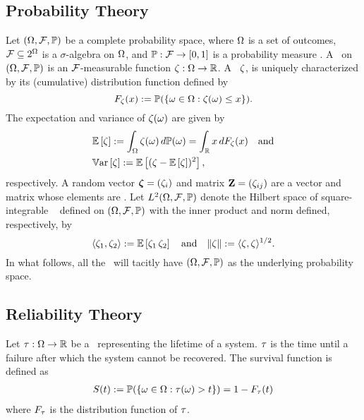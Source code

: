 \subsection{Probability Theory}
Let $(\Omega, \mathcal{F}, \mathbb{P})$ be a complete probability space, where $\Omega$ is a set of outcomes, $\mathcal{F} \subseteq 2^\Omega$ is a $\sigma$-algebra on $\Omega$, and $\mathbb{P}: \mathcal{F} \to [0, 1]$ is a probability measure \cite{durrett2010}.
A \rv\ on $(\Omega, \mathcal{F}, \mathbb{P})$ is an $\mathcal{F}$-measurable function $\zeta: \Omega \to \mathbb{R}$.
A \rv\ $\zeta$, is uniquely characterized by its (cumulative) distribution function defined by
\begin{equation*}
  F_\zeta(x) := \mathbb{P}(\{ \omega \in \Omega: \zeta(\omega) \leq x \}).
\end{equation*}
The expectation and variance of $\zeta(\omega)$ are given by
\begin{align*}
  & \mathbb{E}\left[ \zeta \right] := \int_\Omega \zeta(\omega) \, d\mathbb{P}(\omega) = \int_{\mathbb{R}} x \, d F_\zeta(x) \hspace{1em} \text{and} \\
  & \mathbb{V}\text{ar}\left[ \zeta \right] := \mathbb{E}\left[ (\zeta - \mathbb{E}\left[ \zeta \right])^2 \right],
\end{align*}
respectively.
A random vector $\bm{\zeta} = (\zeta_i)$ and matrix $\mathbf{Z} = (\zeta_{ij})$ are a vector and matrix whose elements are \rvs.
Let $L^{2}(\Omega, \mathcal{F}, \mathbb{P})$ denote the Hilbert space of square-integrable \rvs\ \cite{janson1997} defined on $(\Omega, \mathcal{F}, \mathbb{P})$ with the inner product and norm defined, respectively, by
\begin{equation*}
  \langle \zeta_1, \zeta_2 \rangle := \mathbb{E}\left[ \zeta_1 \, \zeta_2 \right] \hspace{1em} \text{and} \hspace{1em} \| \zeta \| := \langle \zeta, \zeta \rangle^{1/2}.
\end{equation*}
In what follows, all the \rvs\ will tacitly have $(\Omega, \mathcal{F}, \mathbb{P})$ as the underlying probability space.

\subsection{Reliability Theory}
Let $\tau: \Omega \to \mathbb{R}$ be a \rv\ representing the lifetime of a system.
$\tau$ is the time until a failure after which the system cannot be recovered.
The survival function is defined as
\begin{align*}
  S(t) := \mathbb{P}(\{ \omega \in \Omega: \tau(\omega) > t \}) = 1 - F_\tau(t)
\end{align*}
where $F_\tau$ is the distribution function of $\tau$.
